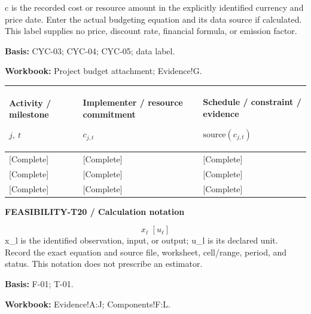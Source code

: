 c is the recorded cost or resource amount in the explicitly identified currency and price date. Enter the actual budgeting equation and its data source if calculated. This label supplies no price, discount rate, financial formula, or emission factor.\par
\textbf{Basis:} CYC-03; CYC-04; CYC-05; data label.\par
\textbf{Workbook:} Project budget attachment; Evidence!G.\par\endgroup
{\sffamily\fontsize{8.3}{10.3}\selectfont\begin{longtable}{@{}P{52.79mm} P{59.39mm} P{52.79mm}@{}}
\toprule
\textbf{Activity / milestone}\par {\normalfont\fontsize{8.2}{10}\selectfont $j,\ t$} & \textbf{Implementer / resource commitment}\par {\normalfont\fontsize{8.2}{10}\selectfont $c_{j,t}$} & \textbf{Schedule / constraint / evidence}\par {\normalfont\fontsize{8.2}{10}\selectfont $\text{source}(c_{j,t})$}\\\midrule\endhead
\rule{0pt}{7.7mm}[Complete] & [Complete] & [Complete]\\\hline
\rule{0pt}{7.7mm}[Complete] & [Complete] & [Complete]\\\hline
\rule{0pt}{7.7mm}[Complete] & [Complete] & [Complete]\\\hline
\end{longtable}}
\par\begingroup\sffamily\fontsize{8}{10}\selectfont\color{NEBGreen}\setlength{\parskip}{2pt}\setlength{\abovedisplayskip}{4pt}\setlength{\belowdisplayskip}{4pt}\setlength{\abovedisplayshortskip}{2pt}\setlength{\belowdisplayshortskip}{3pt}
\textbf{FEASIBILITY-T20 / Calculation notation}\par
{\fontsize{9}{11}\selectfont\[ x_{\ell}\;[u_{\ell}] \]}
x\_l is the identified observation, input, or output; u\_l is its declared unit. Record the exact equation and source file, worksheet, cell/range, period, and status. This notation does not prescribe an estimator.\par
\textbf{Basis:} F-01; T-01.\par
\textbf{Workbook:} Evidence!A:J; Components!F:L.\par\endgroup
